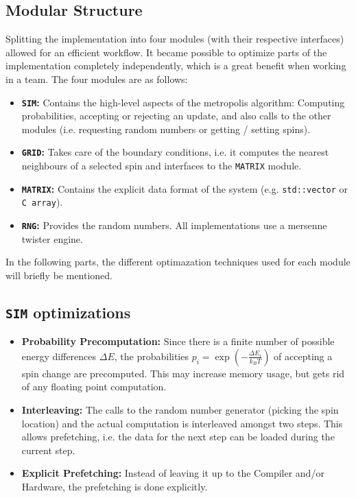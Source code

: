 \documentclass[letterpaper]{article}
\begin{document}
\subsection{Modular Structure} Splitting the implementation into four modules (with their respective interfaces) allowed for an efficient workflow. It became possible to optimize parts of the implementation completely independently, which is a great benefit when working in a team. The four modules are as follows:
\begin{itemize}[noitemsep, topsep = 0pt]
\item \textbf{\texttt{SIM}:} Contains the high-level aspects of the metropolis algorithm: Computing probabilities, accepting or rejecting an update, and also calls to the other modules (i.e. requesting random numbers or getting / setting spins).
\item \textbf{\texttt{GRID}:} Takes care of the boundary conditions, i.e. it computes the nearest neighbours of a selected spin and interfaces to the \texttt{MATRIX} module.
\item \textbf{\texttt{MATRIX}:} Contains the explicit data format  of the system (e.g. \texttt{std::vector} or \texttt{C array}).
\item \textbf{\texttt{RNG}:} Provides the random numbers. All implementations use a mersenne twister engine.
\end{itemize}
In the following parts, the different optimazation techniques used for each module will briefly be mentioned.
\subsection{\texttt{SIM} optimizations}\label{opt:sim}
\begin{itemize}[noitemsep, topsep = 0pt]
\item \textbf{Probability Precomputation:} Since there is a finite number of possible energy differences $\Delta E$, the probabilities $p_i = \exp{\left(-\frac{\Delta E_i}{k_B T}\right)}$ of accepting a spin change are precomputed. This may increase memory usage, but gets rid of any floating point computation.
\item \textbf{Interleaving:} The calls to the random number generator (picking the spin location) and the actual computation is interleaved amongst two steps. This allows prefetching, i.e. the data for the next step can be loaded during the current step.
\item \textbf{Explicit Prefetching:} Instead of leaving it up to the Compiler and/or Hardware, the prefetching is done explicitly. 
\end{itemize}
\end{document}
